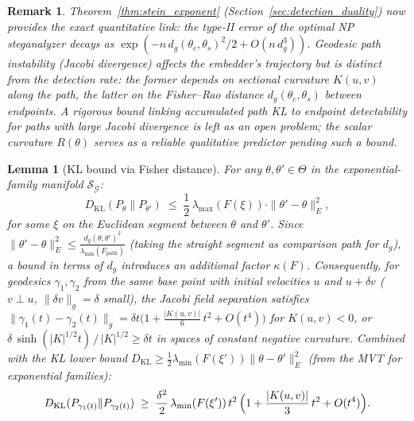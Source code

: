 \documentclass[a4paper,fleqn]{cas-dc}
\newtheorem{lemma}{Lemma}
\newtheorem{remark}{Remark}
\newcommand{\calS}{\mathcal{S}}
\newcommand{\calG}{\mathcal{G}}
\begin{document}
\begin{remark}%
  \label{rem:bridge}
  Theorem~\ref{thm:stein_exponent} (Section~\ref{sec:detection_duality})
  now provides the \emph{exact} quantitative link:
  the type-II error of the optimal NP steganalyzer decays as
  $\exp(-n\,d_g(\theta_c,\theta_s)^2/2 + O(n\,d_g^3))$.
  Geodesic path instability (Jacobi divergence) affects the embedder's
  trajectory but is \emph{distinct} from the detection rate:
  the former depends on sectional curvature $K(u,v)$ along the path,
  the latter on the Fisher--Rao distance $d_g(\theta_c,\theta_s)$
  between endpoints.
  A rigorous bound linking \emph{accumulated path KL} to endpoint
  detectability for paths with large Jacobi divergence is left as an open
  problem; the scalar curvature $R(\theta)$ serves as a reliable
  \emph{qualitative} predictor pending such a bound.
\end{remark}

\begin{lemma}[KL bound via Fisher distance]
  \label{lem:kl_fisher_bound}
  For any $\theta, \theta' \in \Theta$ in the
  exponential-family manifold $\calS_{\calG}$:
  \begin{equation}
    D_{\mathrm{KL}}(P_\theta \| P_{\theta'})
    \;\leq\;
    \frac{1}{2}\,\lambda_{\max}(F(\xi)) \cdot \|\theta' - \theta\|_E^2,
    \label{eq:kl_fisher_bound}
  \end{equation}
  for some $\xi$ on the Euclidean segment between $\theta$ and $\theta'$.
  Since $\|\theta'-\theta\|_E^2 \leq \frac{d_g(\theta,\theta')^2}{\lambda_{\min}(F_{\mathrm{path}})}$
  (taking the straight segment as comparison path for $d_g$),
  a bound in terms of $d_g$ introduces an additional factor $\kappa(F)$.
  Consequently, for geodesics $\gamma_1, \gamma_2$ from the same base
  point with initial velocities $u$ and $u + \delta v$ ($v \perp u$,
  $\|\delta v\|_g = \delta$ small), the Jacobi field separation satisfies
  $\|\gamma_1(t)-\gamma_2(t)\|_g = \delta t\bigl(1 + \tfrac{|K(u,v)|}{6}\,t^2
  + O(t^4)\bigr)$ for $K(u,v)<0$,
  or $\delta\,\sinh(|K|^{1/2}t)\,/\,|K|^{1/2} \geq \delta t$ in spaces of
  constant negative curvature.  Combined with the KL lower bound
  $D_\mathrm{KL} \geq \frac{1}{2}\lambda_{\min}(F(\xi'))\|\theta-\theta'\|_E^2$
  (from the MVT for exponential families):
  \begin{equation}
    D_{\mathrm{KL}}(P_{\gamma_1(t)} \| P_{\gamma_2(t)})
    \;\geq\;
    \frac{\delta^2}{2}\,\lambda_{\min}(F(\xi'))\,t^2
    \,\Bigl(1 + \frac{|K(u,v)|}{3}\,t^2 + O(t^4)\Bigr).
    \label{eq:kl_curvature_bound}
  \end{equation}
\end{lemma}
\end{document}
